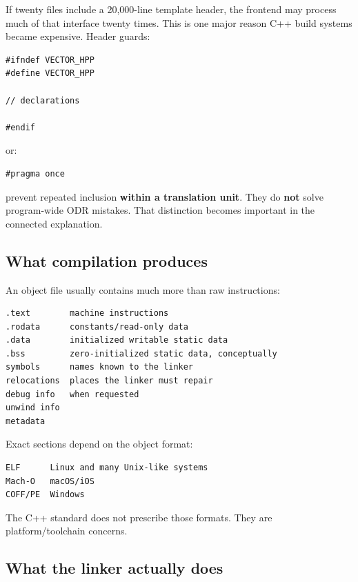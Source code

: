 If twenty  files include a 20,000-line template header, the frontend may process much of that interface twenty times. This is one major reason C++ build systems became expensive. Header guards:

\begin{verbatim}
#ifndef VECTOR_HPP
#define VECTOR_HPP

// declarations

#endif
\end{verbatim}

or:

\begin{verbatim}
#pragma once
\end{verbatim}

prevent repeated inclusion \textbf{within a translation unit}. They do \textbf{not} solve program-wide ODR mistakes. That distinction becomes important in the connected explanation.

\subsection{What compilation produces}\label{01-foundations-i-ch002-what-compilation-produces}

\hypertarget{01-foundations-i-ch002-what-compilation-produces}{}

An object file usually contains much more than raw instructions:

\begin{verbatim}
.text        machine instructions
.rodata      constants/read-only data
.data        initialized writable static data
.bss         zero-initialized static data, conceptually
symbols      names known to the linker
relocations  places the linker must repair
debug info   when requested
unwind info
metadata
\end{verbatim}

Exact sections depend on the object format:

\begin{verbatim}
ELF      Linux and many Unix-like systems
Mach-O   macOS/iOS
COFF/PE  Windows
\end{verbatim}

The C++ standard does not prescribe those formats. They are platform/toolchain concerns.

\subsection{What the linker actually does}\label{01-foundations-i-ch002-what-the-linker-actually-does}

